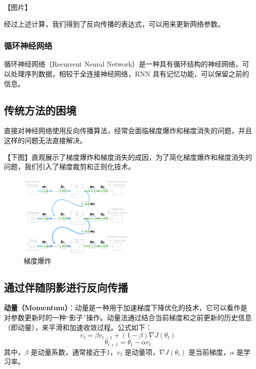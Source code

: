 \documentclass[12pt,a4paper]{amsart}
\begin{document}
【图片】

经过上述计算，我们得到了反向传播的表达式，可以用来更新网络参数。

\subsubsection{循环神经网络}

循环神经网络（Recurrent Neural Network）是一种具有循环结构的神经网络，可以处理序列数据，相较于全连接神经网络，RNN 具有记忆功能，可以保留之前的信息。

\subsection{传统方法的困境}

直接对神经网络使用反向传播算法，经常会面临梯度爆炸和梯度消失的问题，并且这样的问题无法直接解决。

【下图】直观展示了梯度爆炸和梯度消失的成因，为了简化梯度爆炸和梯度消失的问题，我们引入了梯度裁剪和正则化技术。

\begin{figure}[htbp]
    \centering
    \includegraphics[width=0.5\textwidth]{./img/gradient_explosion.jpeg}
    \caption{梯度爆炸}
    \label{fig:lyapunov_spectrum}
  \end{figure}

\subsection{通过伴随阴影进行反向传播}

\textbf{动量（Momentum）}：动量是一种用于加速梯度下降优化的技术，它可以看作是对参数更新时的一种“影子”操作。动量法通过结合当前梯度和之前更新的历史信息（即动量），来平滑和加速收敛过程。公式如下：
\begin{equation}
v_t = \beta v_{t-1} + (1 - \beta) \nabla J(\theta_t)
\end{equation}
\begin{equation}
\theta_{t+1} = \theta_t - \alpha v_t
\end{equation}
其中，$\beta$ 是动量系数，通常接近于1，$v_t$ 是动量项，$\nabla J(\theta_t)$ 是当前梯度，$\alpha$ 是学习率。
\end{document}
